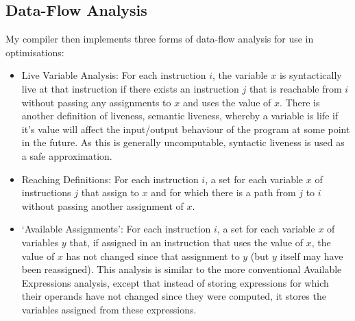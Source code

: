 \subsection{Data-Flow Analysis}
My compiler then implements three forms of data-flow analysis for use in optimisations:
\begin{itemize}
\item Live Variable Analysis: For each instruction $i$, the variable $x$ is syntactically live at that instruction if there exists an instruction $j$ that is reachable from $i$ without passing any assignments to $x$ and uses the value of $x$. There is another definition of liveness, semantic liveness, whereby a variable is life if it's value will affect the input/output behaviour of the program at some point in the future. As this is generally uncomputable, syntactic liveness is used as a safe approximation.
\item Reaching Definitions: For each instruction $i$, a set for each variable $x$ of instructions $j$ that assign to $x$ and for which there is a path from $j$ to $i$ without passing another assignment of $x$.
\item `Available Assignments': For each instruction $i$, a set for each variable $x$ of variables $y$ that, if assigned in an instruction that uses the value of $x$, the value of $x$ has not changed since that assignment to $y$ (but $y$ itself may have been reassigned). This analysis is similar to the more conventional Available Expressions analysis, except that instead of storing expressions for which their operands have not changed since they were computed, it stores the variables assigned from these expressions.
\end{itemize}
